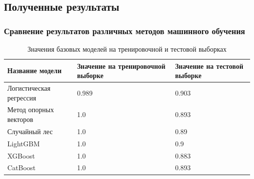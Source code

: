 \documentclass{beamer}
\begin{document}
		\subsection{Полученные результаты}
		\begin{frame}
			\frametitle{Сравнение результатов различных методов машинного обучения}
			\begin{center}
				\begin{table}[!htbp]
					\centering
					\small
					\caption{Значения базовых моделей на тренировочной и тестовой выборках}	
					\label{tabl:baselines}
					\begin{tabularx}{\linewidth}{|X|X|X|}
					\hline
					Название модели & Значение на тренировочной выборке & Значение на тестовой выборке\\ \hline
					Логистическая регрессия & 0.989 & 0.903 \\
					\hline 
					Метод опорных векторов & 1.0 & 0.893 \\
					\hline
					Случайный лес & 1.0 & 0.89 \\
					\hline
					LightGBM & 1.0 & 0.9 \\
					\hline
					XGBoost & 1.0 & 0.883 \\
					\hline
					CatBoost & 1.0 & 0.893 \\ 
					\hline
					\end{tabularx}
				\end{table}
			\end{center}
		\end{frame}
\end{document}
